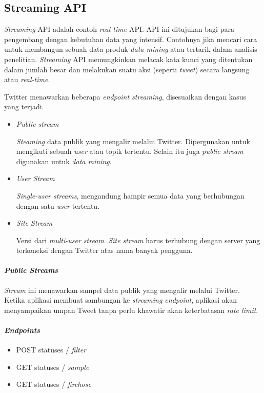 \subsection{Streaming API}
\textit{Streaming} API adalah contoh \textit{real-time} API. API ini ditujukan bagi para pengembang dengan kebutuhan data yang intensif. Contohnya jika mencari cara untuk membangun sebuah data produk \textit{data-mining} atau tertarik dalam analisis penelitian. \textit{Streaming} API memungkinkan melacak kata kunci yang ditentukan dalam jumlah besar dan melakukan suatu aksi (seperti \textit{tweet}) secara langsung atau \textit{real-time}.

Twitter menawarkan beberapa \textit{endpoint streaming}, disesuaikan dengan kasus yang terjadi. 
\begin{itemize}
	\item \textit{Public stream}
	
	\textit{Steaming} data publik yang mengalir melalui Twitter. Dipergunakan untuk mengikuti sebuah \textit{user} atau topik tertentu. Selain itu juga \textit{public stream} digunakan untuk \textit{data mining}.
	\item \textit{User Stream}
	
	\textit{Single-user streams}, mengandung hampir semua data yang berhubungan dengan satu \textit{user} tertentu.
	
	\item \textit{Site Stream}
	
	Versi dari \textit{multi-user stream}. \textit{Site stream} harus terhubung dengan server yang terkoneksi dengan Twitter atas nama banyak pengguna.
\end{itemize}


\paragraph{\textit{Public Streams}}
\textit{Stream} ini menawarkan sampel data publik yang mengalir melalui Twitter. Ketika aplikasi membuat sambungan ke \textit{streaming endpoint}, aplikasi akan menyampaikan umpan Tweet tanpa perlu khawatir akan keterbatasan \textit{rate limit}.

\paragraph{\textit{Endpoints}}
\begin{itemize}
	\item POST statuses / \textit{filter}
	\item GET statuses / \textit{sample}
	\item GET statuses / \textit{firehose}
\end{itemize}

